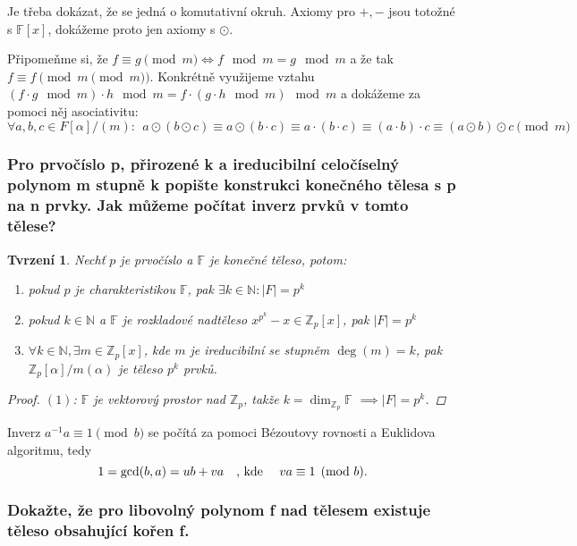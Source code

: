\documentclass[10pt,a4paper]{article}
\newtheorem{tvrzeni}{Tvrzení}
\newcommand{\N}{{\mathbb{N}}}       %
\newcommand{\Z}{{\mathbb{Z}}}       %
\newcommand{\F}{{\mathbb{F}}}       %
\begin{document}
Je třeba dokázat, že se jedná o komutativní okruh. Axiomy pro $+,-$ jsou totožné s $\F[x]$, dokážeme proto jen axiomy s $\odot$.

Připomeňme si, že $f \equiv g \pmod m \iff f \mod m = g \mod m$ a že tak $f \equiv f \pmod{ m\pmod m}$. 
Konkrétně využijeme vztahu $(f \cdot g \mod m) \cdot h \mod m = f \cdot (g \cdot h \mod m) \mod m$ a dokážeme za pomoci něj asociativitu:
$$\forall a,b,c \in F[\alpha]/(m): ~~ a \odot (b\odot c) \equiv a \odot (b \cdot c) \equiv a\cdot (b \cdot c) \equiv (a\cdot b) \cdot c\equiv (a\odot b)\odot c \pmod m$$

\subsubsection{Pro prvočíslo p, přirozené k a ireducibilní celočíselný polynom m stupně k popište konstrukci konečného tělesa s p na n prvky. Jak můžeme počítat inverz prvků v tomto tělese?}
\begin{tvrzeni}\normalfont
    Nechť $p$ je prvočíslo a $\F$ je konečné těleso, potom:
    \begin{enumerate}[label=(\arabic*)]
        \item pokud $p$ je charakteristikou $\F$, pak $\exists k \in \N: |F| = p^k$
        \item pokud $k\in \N$ a $\F$ je rozkladové nadtěleso $x^{p^k}-x \in \Z_p[x]$, pak $|F|=p^k$
        \item $\forall k \in \N, \exists m \in \Z_p[x]$, kde $m$ je ireducibilní se stupněm $\deg(m)=k$, pak $\Z_p[\alpha]/m(\alpha)$ je těleso $p^k$ prvků.
    \end{enumerate}
    \begin{proof}$(1)$: 
        $\F$ je vektorový prostor nad $\Z_p$, takže $k = \dim_{\Z_p}\F$ $\implies |F|=p^k$.
    \end{proof}
\end{tvrzeni}
Inverz $a^{-1}a \equiv 1 \pmod {b}$ se počítá za pomoci Bézoutovy rovnosti a Euklidova algoritmu, tedy $$1=\gcd(b, a)=ub+va\text{\quad , kde \quad}va \equiv 1 \pmod{b}.$$

\subsubsection{Dokažte, že pro libovolný polynom f nad tělesem existuje těleso obsahující kořen f.}
\end{document}

